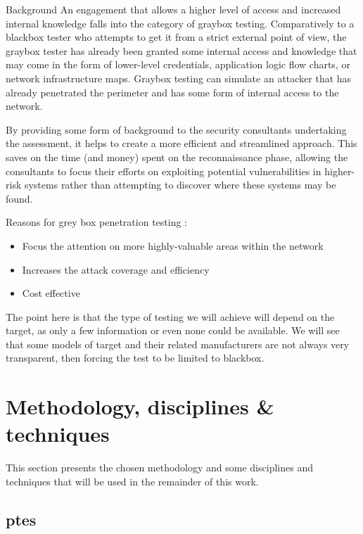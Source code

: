 \begin{chaptercover}{Background}
An engagement that allows a higher level of access and increased internal knowledge falls into the category of graybox testing. Comparatively to a blackbox tester who attempts to get it from a strict external point of view, the graybox tester has already been granted some internal access and knowledge that may come in the form of lower-level credentials, application logic flow charts, or network infrastructure maps. Graybox testing can simulate an attacker that has already penetrated the perimeter and has some form of internal access to the network.

By providing some form of background to the security consultants undertaking the assessment, it helps to create a more efficient and streamlined approach. This saves on the time (and money) spent on the reconnaissance phase, allowing the consultants to focus their efforts on exploiting potential vulnerabilities in higher-risk systems rather than attempting to discover where these systems may be found.

Reasons for grey box penetration testing :
\begin{itemize} \vspace{-.2cm}
  \item[\checkmark] Focus the attention on more highly-valuable areas within the network
  \item[\checkmark] Increases the attack coverage and efficiency
  \item[\checkmark] Cost effective
\end{itemize}

\begin{tip} \hyphenation{}
The point here is that the type of testing we will achieve will depend on the target, as only a few information or even none could be available. We will see that some models of target and their related manufacturers are not always very transparent, then forcing the test to be limited to blackbox.
\end{tip}

\section{Methodology, disciplines \& techniques}

This section presents the chosen methodology and some disciplines and techniques that will be used in the remainder of this work.

\subsection{\acrlong{ptes}}


\end{chaptercover}
